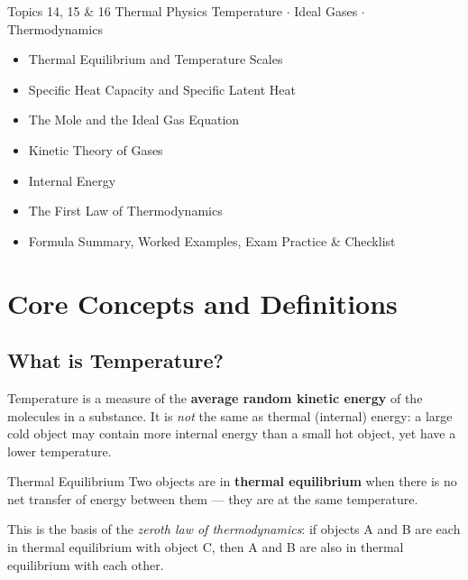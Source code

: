 

\maketitlepage
  {Topics 14, 15 \& 16}
  {Thermal Physics}
  {Temperature \(\cdot\) Ideal Gases \(\cdot\) Thermodynamics}
  {%
    \begin{itemize}[leftmargin=1cm, itemsep=1pt, label=\textbullet]
      \item Thermal Equilibrium and Temperature Scales
      \item Specific Heat Capacity and Specific Latent Heat
      \item The Mole and the Ideal Gas Equation
      \item Kinetic Theory of Gases
      \item Internal Energy
      \item The First Law of Thermodynamics
      \item Formula Summary, Worked Examples, Exam Practice \& Checklist
    \end{itemize}
  }

\tableofcontents
\newpage

\section{Core Concepts and Definitions}

\subsection{What is Temperature?}

Temperature is a measure of the \textbf{average random kinetic energy} of the
molecules in a substance. It is \emph{not} the same as thermal (internal) energy: a
large cold object may contain more internal energy than a small hot object, yet have a
lower temperature.

\begin{defnbox}{Thermal Equilibrium}
Two objects are in \textbf{thermal equilibrium} when there is no net transfer of energy
between them — they are at the same temperature.
\end{defnbox}

This is the basis of the \textit{zeroth law of thermodynamics}: if objects A and B are
each in thermal equilibrium with object C, then A and B are also in thermal equilibrium
with each other.

